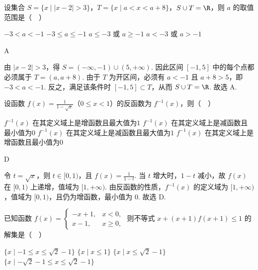 \begin{problem}
设集合 \( S = \{x \mid |x - 2| > 3\} \)，\( T = \{x \mid a < x < a + 8\} \)，\( S \cup T = \R \)，则 \( a \) 的取值范围是（\(\quad\)）

\choices
    {\(-3 < a < -1\)}
    {\(-3 \leqslant a \leqslant -1\)}
    {\(a \leqslant -3\) 或 \(a \geqslant -1\)}
    {\(a < -3\) 或 \(a > -1\)}
\end{problem}

\begin{answer}
A
\end{answer}

\begin{solution}
由 \(\lvert x-2\rvert>3\)，得 \(S=(-\infty,-1)\cup(5,+\infty)\). 因此区间 \([-1,5]\) 中的每个点都必须属于 \(T=(a,a+8)\). 由于 \(T\) 为开区间，必须有 \(a<-1\) 且 \(a+8>5\)，即 \(-3<a<-1\).
反之，满足该条件时 \([-1,5]\subset T\)，从而 \(S\cup T=\R\). 故选 A.
\end{solution}

\begin{problem}
设函数 \( f(x) = \frac{1}{1 - \sqrt{x}} \)（\(0 \leqslant x < 1\)）的反函数为 \( f^{-1}(x) \)，则（\(\quad\)）

\choices
    {\(f^{-1}(x)\) 在其定义域上是增函数且最大值为\(1\)}
    {\(f^{-1}(x)\) 在其定义域上是减函数且最小值为\(0\)}
    {\(f^{-1}(x)\) 在其定义域上是减函数且最大值为\(1\)}
    {\(f^{-1}(x)\) 在其定义域上是增函数且最小值为\(0\)}
\end{problem}

\begin{answer}
D
\end{answer}

\begin{solution}
令 \(t=\sqrt{x}\)，则 \(t\in[0,1)\)，且 \(f(x)=\frac{1}{1-t}\).
当 \(t\) 增大时，\(1-t\) 减小，故 \(f(x)\) 在 \([0,1)\) 上递增，值域为 \([1,+\infty)\). 由反函数的性质，\(f^{-1}(x)\) 的定义域为 \([1,+\infty)\)，值域为 \([0,1)\)，且仍为增函数，最小值为 \(0\). 故选 D.
\end{solution}

\begin{problem}
已知函数 \( f(x) = \begin{cases}
-x + 1, & x < 0,\\
x - 1, & x \geqslant 0,
\end{cases} \) 则不等式 \( x + (x + 1)f(x + 1) \leqslant 1 \) 的解集是（\(\quad\)）

\choices
    {\(\{x\mid -1\leqslant x\leqslant \sqrt{2} -1\}\)}
    {\(\{x\mid x\leqslant 1\}\)}
    {\(\{x\mid x\leqslant \sqrt{2} -1\}\)}
    {\(\{x\mid -\sqrt{2} -1\leqslant x\leqslant \sqrt{2} -1\}\)}
\end{problem}

